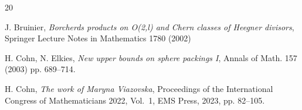 \begin{thebibliography}{20}


 {\sc J. Bruinier}, \emph{Borcherds products on O(2,l) and Chern classes of Heegner divisors}, Springer Lecture Notes in Mathematics 1780 (2002)

  {\sc H. Cohn, N. Elkies}, \emph{New upper bounds on sphere packings I}, Annals of Math. 157 (2003) pp. 689--714.

 {\sc H. Cohn}, \emph{The work of Maryna Viazovska}, Proceedings of the International Congress of Mathematicians 2022, Vol.~1, EMS Press, 2023, pp. 82--105.









\end{thebibliography}
